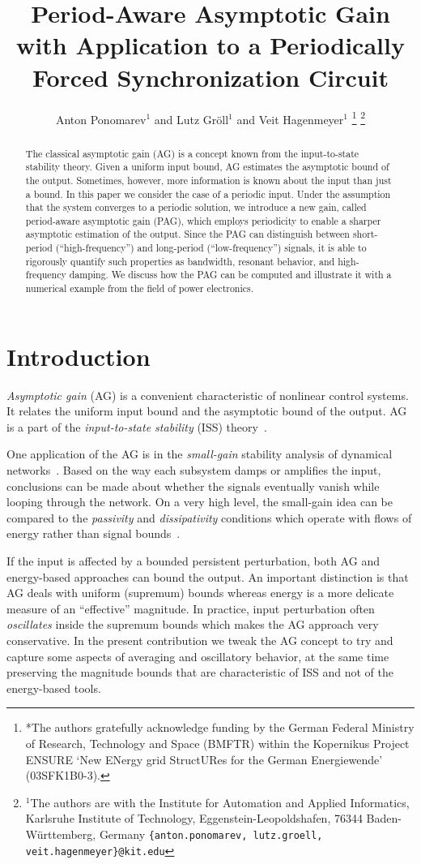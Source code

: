 \documentclass[letterpaper, 10 pt, conference]{ieeeconf}
\title{\LARGE \bf Period-Aware Asymptotic Gain\\with Application to a Periodically Forced Synchronization Circuit}
\author{Anton Ponomarev$^{1}$ and Lutz Gröll$^{1}$ and Veit Hagenmeyer$^{1}$%
\thanks{*The authors gratefully acknowledge funding by the German Federal Ministry of Research, Technology and Space (BMFTR) within the Kopernikus Project ENSURE ‘New ENergy grid StructURes for the German Energiewende’ (03SFK1B0-3).}%
\thanks{$^{1}$The authors are with the Institute for Automation and Applied Informatics, Karlsruhe Institute of Technology, Eggenstein-Leopoldshafen, 76344 Baden-Württemberg, Germany {\tt\small \{anton.ponomarev, lutz.groell, veit.hagenmeyer\}@kit.edu}}%
}
\begin{document}
\maketitle
\thispagestyle{empty}
\pagestyle{empty}

\begin{abstract}
The classical asymptotic gain (AG) is a concept known from the input-to-state stability theory. Given a uniform input bound, AG estimates the asymptotic bound of the output. Sometimes, however, more information is known about the input than just a bound. In this paper we consider the case of a periodic input. Under the assumption that the system converges to a periodic solution, we introduce a new gain, called period-aware asymptotic gain (PAG), which employs periodicity to enable a sharper asymptotic estimation of the output. Since the PAG can distinguish between short-period (``high-frequency'') and long-period (``low-frequency'') signals, it is able to rigorously quantify such properties as bandwidth, resonant behavior, and high-frequency damping. We discuss how the PAG can be computed and illustrate it with a numerical example from the field of power electronics.
\end{abstract}

\section{Introduction}

\emph{Asymptotic gain} (AG) is a convenient characteristic of nonlinear control systems. It relates the uniform input bound and the asymptotic bound of the output. AG is a part of the \emph{input-to-state stability} (ISS) theory~\cite{sontagInputtoStateStabilityProperty1995}.

One application of the AG is in the \emph{small-gain} stability analysis of dynamical networks~\cite{dashkovskiyISSSmallGain2007}. Based on the way each subsystem damps or amplifies the input, conclusions can be made about whether the signals eventually vanish while looping through the network. On a very high level, the small-gain idea can be compared to the \emph{passivity} and \emph{dissipativity} conditions which operate with flows of energy rather than signal bounds~\cite{vidyasagarNewPassivitytypeCriteria1979}. 

If the input is affected by a bounded persistent perturbation, both AG and energy-based approaches can bound the output. An important distinction is that AG deals with uniform (supremum) bounds whereas energy is a more delicate measure of an ``effective'' magnitude. In practice, input perturbation often \emph{oscillates} inside the supremum bounds which makes the AG approach very conservative. In the present contribution we tweak the AG concept to try and capture some aspects of averaging and oscillatory behavior, at the same time preserving the magnitude bounds that are characteristic of ISS and not of the energy-based tools.
\end{document}
